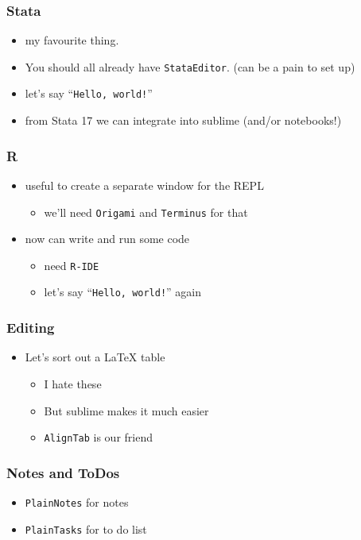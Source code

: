 \documentclass{beamer}
\begin{document}
\begin{frame}
\frametitle{Stata} \label{Stata}
	\begin{itemize}
		\item my favourite thing.
		\item You should all already have \texttt{StataEditor}. (can be a pain to set up)
		\item let's say ``\texttt{Hello, world!}''
		\item from Stata 17 we can integrate into sublime (and/or notebooks!)
	\end{itemize}
\end{frame}

\begin{frame}
\frametitle{R} \label{R}
	\begin{itemize}
		\item useful to create a separate window for the REPL
		\begin{itemize}
			\item we'll need \texttt{Origami} and \texttt{Terminus} for that
		\end{itemize}
		\item now can write and run some code 
		\begin{itemize}
			\item need \texttt{R-IDE}
			\item let's say ``\texttt{Hello, world!}'' again
		\end{itemize}
	\end{itemize}
\end{frame}

\begin{frame}
\frametitle{Editing} \label{Editing}
	\begin{itemize}
		\item Let's sort out a LaTeX table
		\begin{itemize}
			\item I hate these
			\item But sublime makes it much easier
			\item \texttt{AlignTab} is our friend
		\end{itemize}
	\end{itemize}
\end{frame}

\begin{frame}
\frametitle{Notes and ToDos} \label{Notes and ToDos}
	\begin{itemize}
		\item \texttt{PlainNotes} for notes
		\item \texttt{PlainTasks} for to do list
	\end{itemize}
\end{frame}
\end{document}
